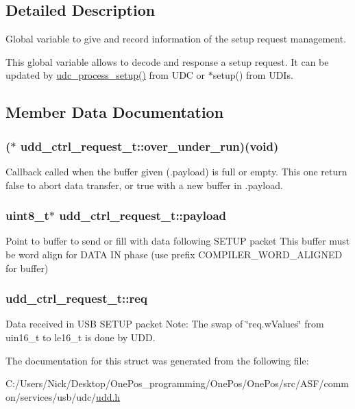 \subsection{Detailed Description}
Global variable to give and record information of the setup request management. 

This global variable allows to decode and response a setup request. It can be updated by \hyperlink{group__udc__group__interne_ga58c2916d7984e0e5b2143cadf4af6080}{udc\-\_\-process\-\_\-setup()} from U\-D\-C or $\ast$setup() from U\-D\-Is. 

\subsection{Member Data Documentation}
\hypertarget{structudd__ctrl__request__t_afb9dab5e58e325dae17ea02345b097c4}{
\subsubsection[{over\-\_\-under\-\_\-run}]{($\ast$ udd\-\_\-ctrl\-\_\-request\-\_\-t\-::over\-\_\-under\-\_\-run)(void)}}\label{structudd__ctrl__request__t_afb9dab5e58e325dae17ea02345b097c4}
Callback called when the buffer given (.payload) is full or empty. This one return false to abort data transfer, or true with a new buffer in .payload. \hypertarget{structudd__ctrl__request__t_a30ee45cc3e128d219f779f32635b6ca0}{
\subsubsection[{payload}]{\setlength{\rightskip}{0pt plus 5cm}uint8\-\_\-t$\ast$ udd\-\_\-ctrl\-\_\-request\-\_\-t\-::payload}}\label{structudd__ctrl__request__t_a30ee45cc3e128d219f779f32635b6ca0}
Point to buffer to send or fill with data following S\-E\-T\-U\-P packet This buffer must be word align for D\-A\-T\-A I\-N phase (use prefix C\-O\-M\-P\-I\-L\-E\-R\-\_\-\-W\-O\-R\-D\-\_\-\-A\-L\-I\-G\-N\-E\-D for buffer) \hypertarget{structudd__ctrl__request__t_ab662e15ddbc5bc5f77592b24b937757b}{
\subsubsection[{req}]{ udd\-\_\-ctrl\-\_\-request\-\_\-t\-::req}}\label{structudd__ctrl__request__t_ab662e15ddbc5bc5f77592b24b937757b}
Data received in U\-S\-B S\-E\-T\-U\-P packet Note\-: The swap of \char`\"{}req.\-w\-Values\char`\"{} from uin16\-\_\-t to le16\-\_\-t is done by U\-D\-D. 

The documentation for this struct was generated from the following file\-:\begin{DoxyCompactItemize}
\item 
C\-:/\-Users/\-Nick/\-Desktop/\-One\-Pos\-\_\-programming/\-One\-Pos/\-One\-Pos/src/\-A\-S\-F/common/services/usb/udc/\hyperlink{udd_8h}{udd.\-h}\end{DoxyCompactItemize}
